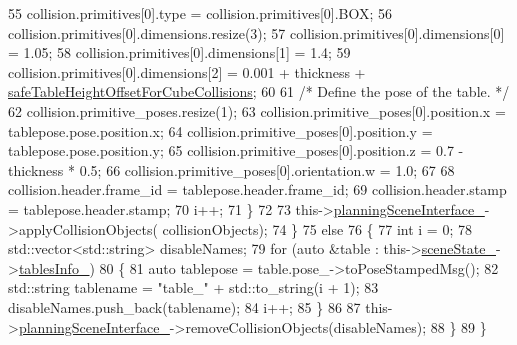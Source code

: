 \begin{DoxyCode}
55                     collision.primitives[0].type = collision.primitives[0].BOX;
56                     collision.primitives[0].dimensions.resize(3);
57                     collision.primitives[0].dimensions[0] = 1.05;
58                     collision.primitives[0].dimensions[1] = 1.4;
59                     collision.primitives[0].dimensions[2] = 0.001 + thickness + 
      \hyperlink{classsm__moveit__screw__loop_1_1cl__move__group__interface_1_1CpConstraintTableWorkspaces_aef6283c1b9bc7b0aeb7c106b6e70a055}{safeTableHeightOffsetForCubeCollisions};
60 
61                     \textcolor{comment}{/* Define the pose of the table. */}
62                     collision.primitive\_poses.resize(1);
63                     collision.primitive\_poses[0].position.x = tablepose.pose.position.x;
64                     collision.primitive\_poses[0].position.y = tablepose.pose.position.y;
65                     collision.primitive\_poses[0].position.z = 0.7 - thickness * 0.5;
66                     collision.primitive\_poses[0].orientation.w = 1.0;
67 
68                     collision.header.frame\_id = tablepose.header.frame\_id;
69                     collision.header.stamp = tablepose.header.stamp;
70                     i++;
71                 \}
72 
73                 this->\hyperlink{classsm__moveit__screw__loop_1_1cl__move__group__interface_1_1CpConstraintTableWorkspaces_aba416ccafc9506f7587ec32fefe6b5f4}{planningSceneInterface\_}->applyCollisionObjects(
      collisionObjects);
74             \}
75             \textcolor{keywordflow}{else}
76             \{
77                 \textcolor{keywordtype}{int} i = 0;
78                 std::vector<std::string> disableNames;
79                 \textcolor{keywordflow}{for} (\textcolor{keyword}{auto} &table : this->\hyperlink{classsm__moveit__screw__loop_1_1cl__move__group__interface_1_1CpConstraintTableWorkspaces_ad16c51287b6178319fc8779eb88b28dd}{sceneState\_}->\hyperlink{classsm__moveit__screw__loop_1_1cl__perception__system_1_1CpSceneState_a13c7fd5645885ad697cedb48edbb3f09}{tablesInfo\_})
80                 \{
81                     \textcolor{keyword}{auto} tablepose = table.pose\_->toPoseStampedMsg();
82                     std::string tablename = \textcolor{stringliteral}{"table\_"} + std::to\_string(i + 1);
83                     disableNames.push\_back(tablename);
84                     i++;
85                 \}
86 
87                 this->\hyperlink{classsm__moveit__screw__loop_1_1cl__move__group__interface_1_1CpConstraintTableWorkspaces_aba416ccafc9506f7587ec32fefe6b5f4}{planningSceneInterface\_}->removeCollisionObjects(disableNames);
88             \}
89         \}
\end{DoxyCode}
